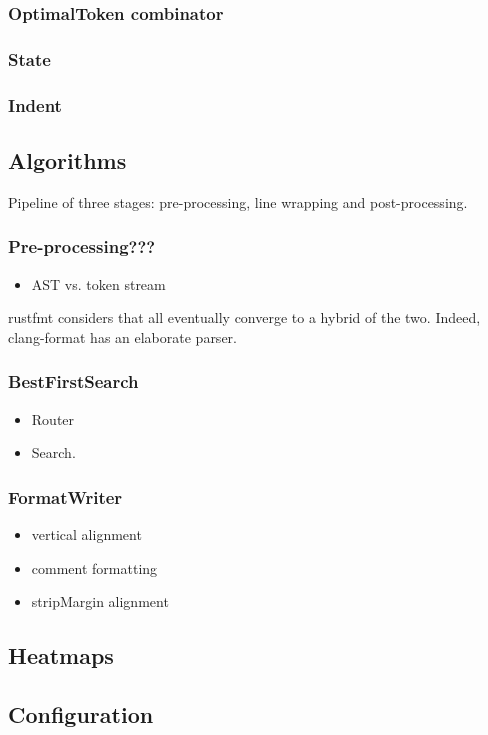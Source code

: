 \documentclass[11pt,a4paper]{article}
\begin{document}
\subsubsection{OptimalToken combinator}
\subsubsection{State}
\subsubsection{Indent}
\subsection{Algorithms}
Pipeline of three stages: pre-processing, line wrapping and post-processing.
\subsubsection{Pre-processing???}
 \begin{itemize}
   \item AST vs. token stream
 \end{itemize}
rustfmt considers that all eventually converge to a hybrid of the two.
Indeed, clang-format has an elaborate parser.
\subsubsection{BestFirstSearch}
\begin{itemize}
  \item Router
  \item Search.
\end{itemize}
\subsubsection{FormatWriter}
\begin{itemize}
  \item vertical alignment
  \item comment formatting
  \item stripMargin alignment
\end{itemize}
\subsection{Heatmaps}
\subsection{Configuration}
\end{document}
